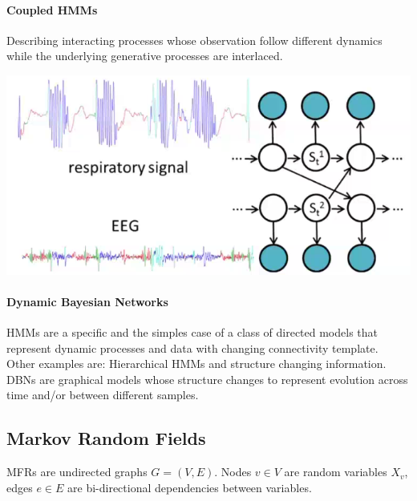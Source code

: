 \documentclass[10pt]{report}
\begin{document}
\paragraph{Coupled HMMs} Describing interacting processes whose observation follow different dynamics while the underlying generative processes are interlaced.
\begin{center}
	\includegraphics[scale=0.5]{32.png}
\end{center}
\paragraph{Dynamic Bayesian Networks} HMMs are a specific and the simples case of a class of directed models that represent dynamic processes and data with changing connectivity template. Other examples are: Hierarchical HMMs and structure changing information.\\
DBNs are graphical models whose structure changes to represent evolution across time and/or between different samples.
\subsection{Markov Random Fields}
MFRs are undirected graphs $G = (V, E)$. Nodes $v\in V$ are random variables $X_v$, edges $e\in E$ are bi-directional dependencies between variables.
\end{document}
